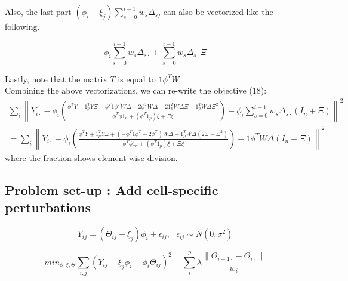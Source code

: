 \documentclass[11pt]{article}
\newcommand{\norm}[1]{\left\lVert#1\right\rVert}
\begin{document}
Also, the last part $(\phi_i+\xi_j) \sum_{s=0}^{i-1} w_s \Delta_{sj}$ can also be vectorized like the following.

$$
\phi_i \sum_{s=0}^{i-1} w_s \Delta_{s \cdot} + \sum_{s=0}^{i-1} w_s \Delta_{s\cdot} \Xi
$$

Lastly, note that the matrix $T$ is equal to $1\phi^TW$\\

Combining the above vectorizations, we can re-write the objective (18):
\begin{align*}
\sum_i \norm{ Y_{i\cdot} - \phi_i \left(  \frac{
\phi^T Y + 1_p^T Y \Xi - \phi^T 1\phi^TW \Delta - 2\phi^TW\Delta - 21_p^TW\Delta\Xi + 1_p^T W \Delta \Xi^2 }{\phi^T \phi 1_n + (\phi^T 1_p) \xi + \Xi \xi}    \right) - \phi_i \sum_{s=0}^{i-1} w_s \Delta_{s\cdot} (I_n+\Xi)
}^2
\end{align*}
\begin{align*}
= \sum_i \norm{
Y_{i\cdot} - \phi_i \left(
\frac{
\phi^T Y + 1_p^T Y\Xi + (-\phi^T1\phi^T - 2\phi^T) W\Delta - 1_p^TW\Delta(2\Xi - \Xi^2)
}{
\phi^T \phi 1_n + (\phi^T 1_p) \xi + \Xi \xi
}
\right)
-1\phi^TW\Delta (I_n+\Xi)
}^2
\end{align*}
where the fraction shows element-wise division. 

\pagebreak
\subsection*{Problem set-up : Add cell-specific perturbations}

\begin{equation}
Y_{ij} = (\Theta_{ij}+\xi_j)\phi_i + \epsilon_{ij}, \text{  } \epsilon_{ij} \sim N(0, \sigma^2)
\end{equation}

\begin{equation}
min_{\phi, \xi, \Theta} \sum_{i,j} (Y_{ij} - \xi_j \phi_i - \phi_i \Theta_{ij})^2 + \sum_{i}^p \lambda \frac{\|\Theta_{i+1\cdot} - \Theta_{i\cdot}  \|}{w_i}
\end{equation}
\end{document}
